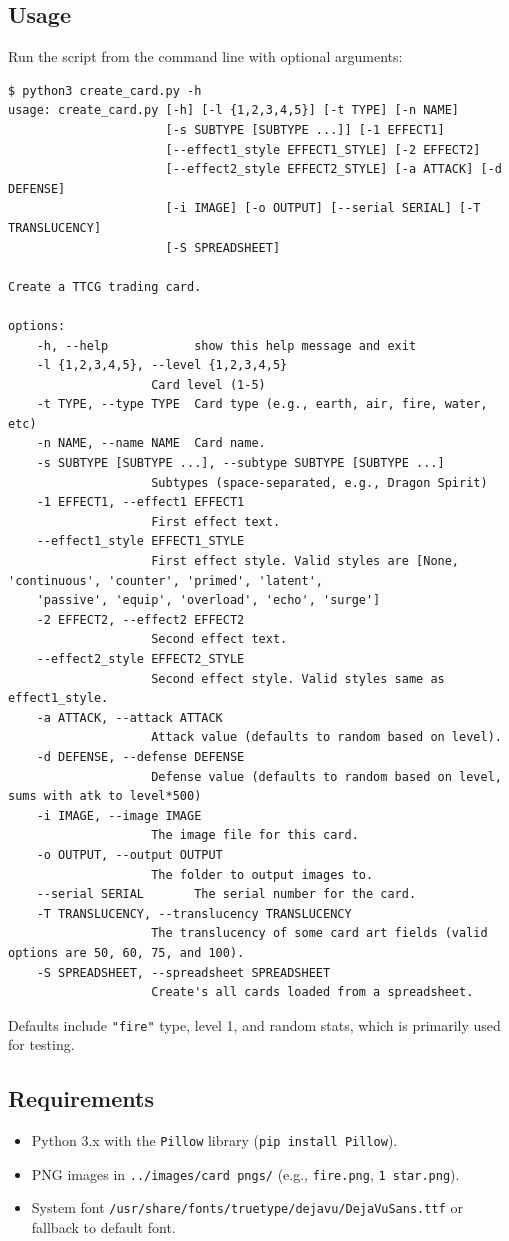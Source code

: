 \subsection{Usage}
Run the script from the command line with optional arguments:
\begin{lstlisting}[style=terminalstyle]
$ python3 create_card.py -h
usage: create_card.py [-h] [-l {1,2,3,4,5}] [-t TYPE] [-n NAME]
                      [-s SUBTYPE [SUBTYPE ...]] [-1 EFFECT1]
                      [--effect1_style EFFECT1_STYLE] [-2 EFFECT2]
                      [--effect2_style EFFECT2_STYLE] [-a ATTACK] [-d DEFENSE]
                      [-i IMAGE] [-o OUTPUT] [--serial SERIAL] [-T TRANSLUCENCY]
                      [-S SPREADSHEET]

Create a TTCG trading card.

options:
	-h, --help            show this help message and exit
	-l {1,2,3,4,5}, --level {1,2,3,4,5}
					Card level (1-5)
	-t TYPE, --type TYPE  Card type (e.g., earth, air, fire, water, etc)
	-n NAME, --name NAME  Card name.
	-s SUBTYPE [SUBTYPE ...], --subtype SUBTYPE [SUBTYPE ...]
					Subtypes (space-separated, e.g., Dragon Spirit)
	-1 EFFECT1, --effect1 EFFECT1
					First effect text.
	--effect1_style EFFECT1_STYLE
					First effect style. Valid styles are [None, 'continuous', 'counter', 'primed', 'latent',
	'passive', 'equip', 'overload', 'echo', 'surge']
	-2 EFFECT2, --effect2 EFFECT2
					Second effect text.
	--effect2_style EFFECT2_STYLE
					Second effect style. Valid styles same as effect1_style.
	-a ATTACK, --attack ATTACK
					Attack value (defaults to random based on level).
	-d DEFENSE, --defense DEFENSE
					Defense value (defaults to random based on level, sums with atk to level*500)
	-i IMAGE, --image IMAGE
					The image file for this card.
	-o OUTPUT, --output OUTPUT
					The folder to output images to.
	--serial SERIAL       The serial number for the card.
	-T TRANSLUCENCY, --translucency TRANSLUCENCY
					The translucency of some card art fields (valid options are 50, 60, 75, and 100).
	-S SPREADSHEET, --spreadsheet SPREADSHEET
					Create's all cards loaded from a spreadsheet.
\end{lstlisting}
Defaults include \texttt{"fire"} type, level 1, and random stats, which is primarily used for testing.

\subsection{Requirements}
\begin{itemize}
	\item Python 3.x with the \texttt{Pillow} library (\texttt{pip install Pillow}).
	\item PNG images in \texttt{../images/card pngs/} (e.g., \texttt{fire.png}, \texttt{1 star.png}).
	\item System font \texttt{/usr/share/fonts/truetype/dejavu/DejaVuSans.ttf} or fallback to default font.
\end{itemize}


